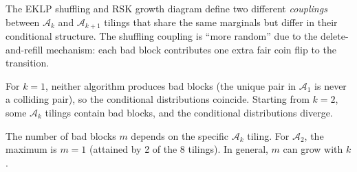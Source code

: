 \documentclass[letterpaper,11pt,oneside]{article}
\newcommand{\AZ}{\mathcal{A}}
\begin{document}
The EKLP shuffling and RSK growth diagram define two different
\emph{couplings} between $\AZ_k$ and $\AZ_{k+1}$ tilings that share the
same marginals but differ in their conditional structure.  The shuffling
coupling is ``more random'' due to the delete-and-refill mechanism: each bad
block contributes one extra fair coin flip to the transition.

For $k = 1$, neither algorithm produces bad blocks (the unique pair in
$\AZ_1$ is never a colliding pair), so the conditional distributions coincide.
Starting from $k = 2$, some $\AZ_k$ tilings contain bad blocks, and the
conditional distributions diverge.

The number of bad blocks $m$ depends on the specific $\AZ_k$ tiling.
For $\AZ_2$, the maximum is $m = 1$ (attained by 2 of the 8 tilings).
In general, $m$ can grow with $k$.
\end{document}
